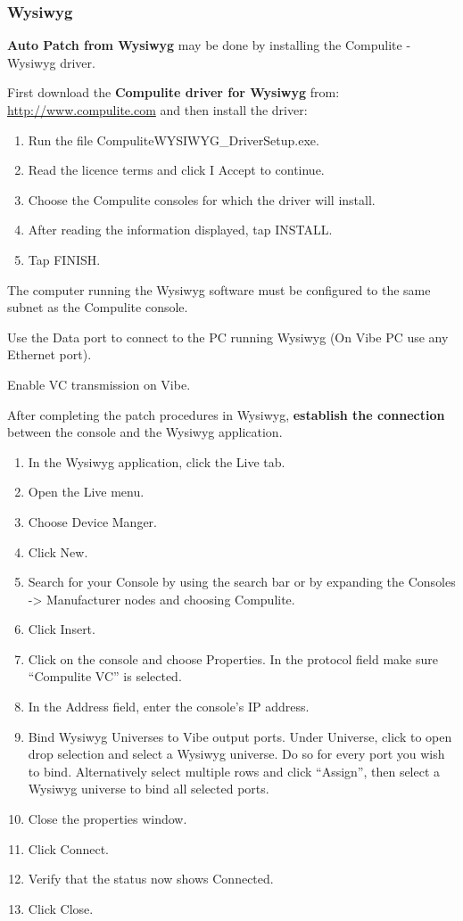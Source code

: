 \documentclass[
]{article}
\begin{document}
\hypertarget{wysiwyg-1}{%
\subsubsection{Wysiwyg}\label{wysiwyg-1}}

\textbf{Auto Patch from Wysiwyg} may be done by installing the Compulite - Wysiwyg driver.

First download the \textbf{Compulite driver for Wysiwyg} from: \url{http://www.compulite.com} and then install the driver:

\begin{enumerate}
\def\labelenumi{\arabic{enumi}.}
\item
  Run the file CompuliteWYSIWYG\_DriverSetup.exe.
\item
  Read the licence terms and click I Accept to continue.
\item
  Choose the Compulite consoles for which the driver will install.
\item
  After reading the information displayed, tap INSTALL.
\item
  Tap FINISH.
\end{enumerate}

The computer running the Wysiwyg software must be configured to the same subnet as the Compulite console.

Use the Data port to connect to the PC running Wysiwyg (On Vibe PC use any Ethernet port).

Enable VC transmission on Vibe.

After completing the patch procedures in Wysiwyg, \textbf{establish the connection} between the console and the Wysiwyg application.

\begin{enumerate}
\def\labelenumi{\arabic{enumi}.}
\item
  In the Wysiwyg application, click the Live tab.
\item
  Open the Live menu.
\item
  Choose Device Manger.
\item
  Click New.
\item
  Search for your Console by using the search bar or by expanding the Consoles -\textgreater{} Manufacturer nodes and choosing Compulite.
\item
  Click Insert.
\item
  Click on the console and choose Properties. In the protocol field make sure ``Compulite VC'' is selected.
\item
  In the Address field, enter the console's IP address.
\item
  Bind Wysiwyg Universes to Vibe output ports. Under Universe, click to open drop selection and select a Wysiwyg universe. Do so for every port you wish to bind. Alternatively select multiple rows and click ``Assign'', then select a Wysiwyg universe to bind all selected ports.
\item
  Close the properties window.
\item
  Click Connect.
\item
  Verify that the status now shows Connected.
\item
  Click Close.
\end{enumerate}
\end{document}
